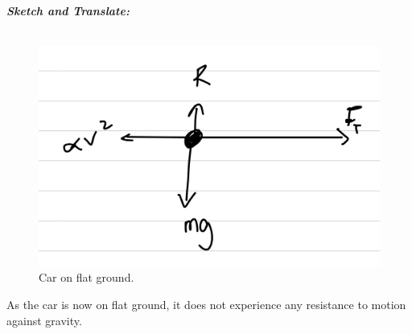 \begin{subquestions}
\subquestion
	
\begin{subsubquestions}
	
\subsubquestion

\textbf{\textit{Sketch and Translate:}} \\ \\
\begin{figure}[H]
	\begin{center}
		\includegraphics[scale=0.25]{../2009/figures/2009q5-2}
		\caption{\label{2009:q5:Sketch2} Car on flat ground.}
	\end{center}
\end{figure}	
As the car is now on flat ground, it does not experience any resistance to motion against gravity. 





\end{subsubquestions}
\end{subquestions}
